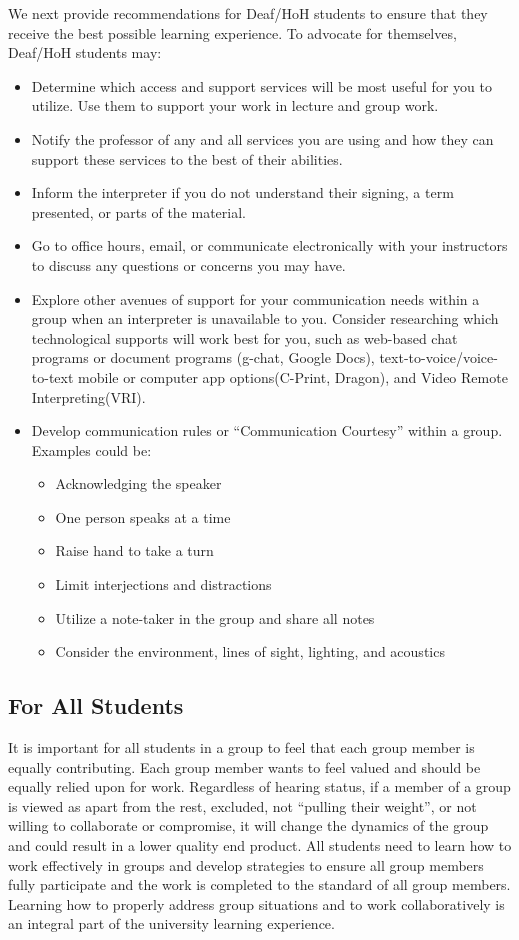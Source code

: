 \documentclass[conference]{IEEEtran}
\begin{document}
We next provide recommendations for Deaf/HoH students to ensure that they receive the best possible learning experience. To advocate for themselves, Deaf/HoH students may:

\begin{itemize}
\item Determine which access and support services will be most useful for you to utilize. Use them to support your work in lecture and group work.
\item Notify the professor of any and all services you are using and how they can support these services to the best of their abilities.
\item Inform the interpreter if you do not understand their signing, a term presented, or parts of the material.
\item Go to office hours, email, or communicate electronically with your instructors to discuss any questions or concerns you may have.
\item Explore other avenues of support for your communication needs within a group when an interpreter is unavailable to you. Consider researching which technological supports will work best for you, such as web-based chat programs or document programs (g-chat, Google Docs), text-to-voice/voice-to-text mobile or computer app options(C-Print, Dragon), and Video Remote Interpreting(VRI).
\item Develop communication rules or ``Communication Courtesy'' within a group. Examples could be:
	\begin{itemize}
	\item Acknowledging the speaker
	\item One person speaks at a time
	\item Raise hand to take a turn
	\item Limit interjections and distractions
	\item Utilize a note-taker in the group and share all notes
	\item Consider the environment, lines of sight, lighting, and acoustics
 \end{itemize}
 \end{itemize}

\subsection{For All Students}
It is important for all students in a group to feel that each group member is equally contributing. Each group member wants to feel valued and should be equally relied upon for work. Regardless of hearing status, if a member of a group is viewed as apart from the rest, excluded, not ``pulling their weight'', or not willing to collaborate or compromise, it will change the dynamics of the group and could result in a lower quality end product. All students need to learn how to work effectively in groups and develop strategies to ensure all group members fully participate and the work is completed to the standard of all group members. Learning how to properly address group situations and to work collaboratively is an integral part of the university learning experience.
\end{document}

